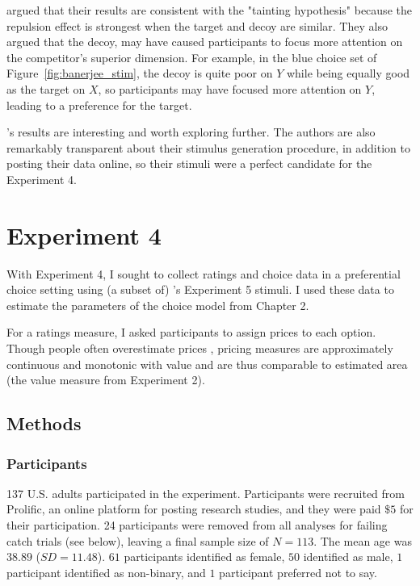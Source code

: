 \textcite{banerjeeFactorsThatPromote2024} argued that their results are consistent with the "tainting hypothesis" \parencite{simonson2014vices} because the repulsion effect is strongest when the target and decoy are similar. They also argued that the decoy, may have caused participants to focus more attention on the competitor's superior dimension. For example, in the blue choice set of Figure~\ref{fig:banerjee_stim}, the decoy is quite poor on $Y$ while being equally good as the target on $X$, so participants may have focused more attention on $Y$, leading to a preference for the target. 

\textcite{banerjeeFactorsThatPromote2024}'s results are interesting and worth exploring further. The authors are also remarkably transparent about their stimulus generation procedure, in addition to posting their data online, so their stimuli were a perfect candidate for the Experiment 4.

\section{Experiment 4}

With Experiment 4, I sought to collect ratings and choice data in a preferential choice setting using (a subset of) \textcite{banerjeeFactorsThatPromote2024}'s Experiment 5 stimuli. I used these data to estimate the parameters of the choice model from Chapter 2. 

For a ratings measure, I asked participants to assign prices to each option. Though people often overestimate prices \parencite{breidertREVIEWMETHODSMEASURING2006}, pricing measures are approximately continuous and monotonic with value and are thus comparable to estimated area (the value measure from Experiment 2).

\subsection{Methods}

\subsubsection{Participants}
137 U.S. adults participated in the experiment. Participants were recruited from Prolific, an online platform for posting research studies, and they were paid $\$5$ for their participation. 24 participants were removed from all analyses for failing catch trials (see below), leaving a final sample size of $N=113$. The mean age was $38.89$ ($SD=11.48$). $61$ participants identified as female, $50$ identified as male, $1$ participant identified as non-binary, and $1$ participant preferred not to say.


